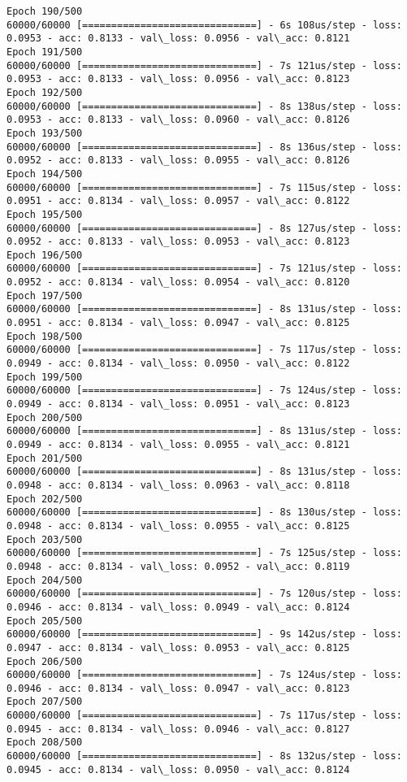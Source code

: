 \documentclass[11pt]{article}
\begin{document}
\begin{Verbatim}[commandchars=\\\{\}]
Epoch 190/500
60000/60000 [==============================] - 6s 108us/step - loss: 0.0953 - acc: 0.8133 - val\_loss: 0.0956 - val\_acc: 0.8121
Epoch 191/500
60000/60000 [==============================] - 7s 121us/step - loss: 0.0953 - acc: 0.8133 - val\_loss: 0.0956 - val\_acc: 0.8123
Epoch 192/500
60000/60000 [==============================] - 8s 138us/step - loss: 0.0953 - acc: 0.8133 - val\_loss: 0.0960 - val\_acc: 0.8126
Epoch 193/500
60000/60000 [==============================] - 8s 136us/step - loss: 0.0952 - acc: 0.8133 - val\_loss: 0.0955 - val\_acc: 0.8126
Epoch 194/500
60000/60000 [==============================] - 7s 115us/step - loss: 0.0951 - acc: 0.8134 - val\_loss: 0.0957 - val\_acc: 0.8122
Epoch 195/500
60000/60000 [==============================] - 8s 127us/step - loss: 0.0952 - acc: 0.8133 - val\_loss: 0.0953 - val\_acc: 0.8123
Epoch 196/500
60000/60000 [==============================] - 7s 121us/step - loss: 0.0952 - acc: 0.8134 - val\_loss: 0.0954 - val\_acc: 0.8120
Epoch 197/500
60000/60000 [==============================] - 8s 131us/step - loss: 0.0951 - acc: 0.8134 - val\_loss: 0.0947 - val\_acc: 0.8125
Epoch 198/500
60000/60000 [==============================] - 7s 117us/step - loss: 0.0949 - acc: 0.8134 - val\_loss: 0.0950 - val\_acc: 0.8122
Epoch 199/500
60000/60000 [==============================] - 7s 124us/step - loss: 0.0949 - acc: 0.8134 - val\_loss: 0.0951 - val\_acc: 0.8123
Epoch 200/500
60000/60000 [==============================] - 8s 131us/step - loss: 0.0949 - acc: 0.8134 - val\_loss: 0.0955 - val\_acc: 0.8121
Epoch 201/500
60000/60000 [==============================] - 8s 131us/step - loss: 0.0948 - acc: 0.8134 - val\_loss: 0.0963 - val\_acc: 0.8118
Epoch 202/500
60000/60000 [==============================] - 8s 130us/step - loss: 0.0948 - acc: 0.8134 - val\_loss: 0.0955 - val\_acc: 0.8125
Epoch 203/500
60000/60000 [==============================] - 7s 125us/step - loss: 0.0948 - acc: 0.8134 - val\_loss: 0.0952 - val\_acc: 0.8119
Epoch 204/500
60000/60000 [==============================] - 7s 120us/step - loss: 0.0946 - acc: 0.8134 - val\_loss: 0.0949 - val\_acc: 0.8124
Epoch 205/500
60000/60000 [==============================] - 9s 142us/step - loss: 0.0947 - acc: 0.8134 - val\_loss: 0.0953 - val\_acc: 0.8125
Epoch 206/500
60000/60000 [==============================] - 7s 124us/step - loss: 0.0946 - acc: 0.8134 - val\_loss: 0.0947 - val\_acc: 0.8123
Epoch 207/500
60000/60000 [==============================] - 7s 117us/step - loss: 0.0945 - acc: 0.8134 - val\_loss: 0.0946 - val\_acc: 0.8127
Epoch 208/500
60000/60000 [==============================] - 8s 132us/step - loss: 0.0945 - acc: 0.8134 - val\_loss: 0.0950 - val\_acc: 0.8124

\end{Verbatim}
\end{document}
